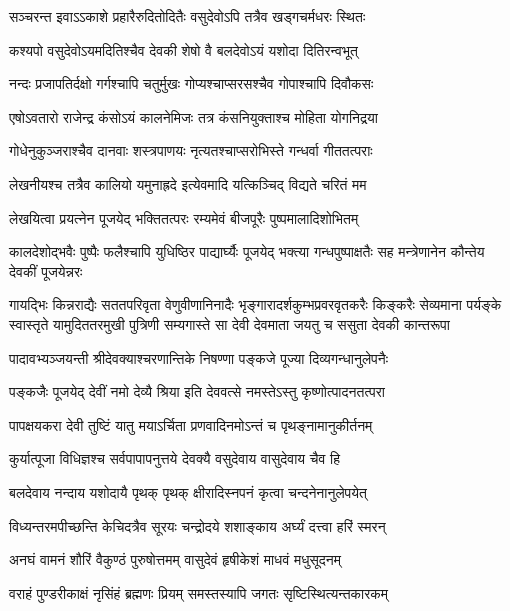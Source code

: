 \twolineshloka
{सञ्चरन्त इवाऽऽकाशे प्रहारैरुदितोदितैः}
{वसुदेवोऽपि तत्रैव खड्गचर्मधरः स्थितः}%

\twolineshloka
{कश्यपो वसुदेवोऽयमदितिश्चैव देवकी}
{शेषो वै बलदेवोऽयं यशोदा दितिरन्वभूत्}%

\twolineshloka
{नन्दः प्रजापतिर्दक्षो गर्गश्चापि चतुर्मुखः}
{गोप्यश्चाप्सरसश्चैव गोपाश्चापि दिवौकसः}%

\twolineshloka
{एषोऽवतारो राजेन्द्र कंसोऽयं कालनेमिजः}
{तत्र कंसनियुक्ताश्च मोहिता योगनिद्रया}%

\twolineshloka
{गोधेनुकुञ्जराश्चैव दानवाः शस्त्रपाणयः}
{नृत्यतश्चाप्सरोभिस्ते गन्धर्वा गीततत्पराः}%

\twolineshloka
{लेखनीयश्च तत्रैव कालियो यमुनाह्रदे}
{इत्येवमादि यत्किञ्चिद् विद्यते चरितं मम}%

\twolineshloka
{लेखयित्वा प्रयत्नेन पूजयेद् भक्तितत्परः}
{रम्यमेवं बीजपूरैः पुष्पमालादिशोभितम्}%

\threelineshloka
{कालदेशोद्भवैः पुष्पैः फलैश्चापि युधिष्ठिर}
{पाद्यार्घ्यैः पूजयेद् भक्त्या गन्धपुष्पाक्षतैः सह}
{मन्त्रेणानेन कौन्तेय देवकीं पूजयेन्नरः}%

\fourlineindentedshloka
{गायद्भिः किन्नराद्यैः सततपरिवृता वेणुवीणानिनादैः}
{भृङ्गारादर्शकुम्भप्रवरवृतकरैः किङ्करैः सेव्यमाना}
{पर्यङ्के स्वास्तृते यामुदिततरमुखी पुत्रिणी सम्यगास्ते}
{सा देवी देवमाता जयतु च ससुता देवकी कान्तरूपा}%


\twolineshloka
{पादावभ्यञ्जयन्ती श्रीदेवक्याश्चरणान्तिके}
{निषण्णा पङ्कजे पूज्या दिव्यगन्धानुलेपनैः}%


\twolineshloka
{पङ्कजैः पूजयेद् देवीं नमो देव्यै श्रिया इति}
{देववत्से नमस्तेऽस्तु कृष्णोत्पादनतत्परा}%


\twolineshloka
{पापक्षयकरा देवी तुष्टिं यातु मयाऽर्चिता}
{प्रणवादिनमोऽन्तं च पृथङ्नामानुकीर्तनम्}%


\twolineshloka
{कुर्यात्पूजा विधिज्ञश्च सर्वपापापनुत्तये}
{देवक्यै वसुदेवाय वासुदेवाय चैव हि}%


\twolineshloka
{बलदेवाय नन्दाय यशोदायै पृथक् पृथक्}
{क्षीरादिस्नपनं कृत्वा चन्दनेनानुलेपयेत्}%


\twolineshloka
{विध्यन्तरमपीच्छन्ति केचिदत्रैव सूरयः}
{चन्द्रोदये शशाङ्काय अर्घ्यं दत्त्वा हरिं स्मरन्}%


\twolineshloka
{अनघं वामनं शौरिं वैकुण्ठं पुरुषोत्तमम्}
{वासुदेवं हृषीकेशं माधवं मधुसूदनम्}%


\twolineshloka
{वराहं पुण्डरीकाक्षं नृसिंहं ब्रह्मणः प्रियम्}
{समस्तस्यापि जगतः सृष्टिस्थित्यन्तकारकम्}%


